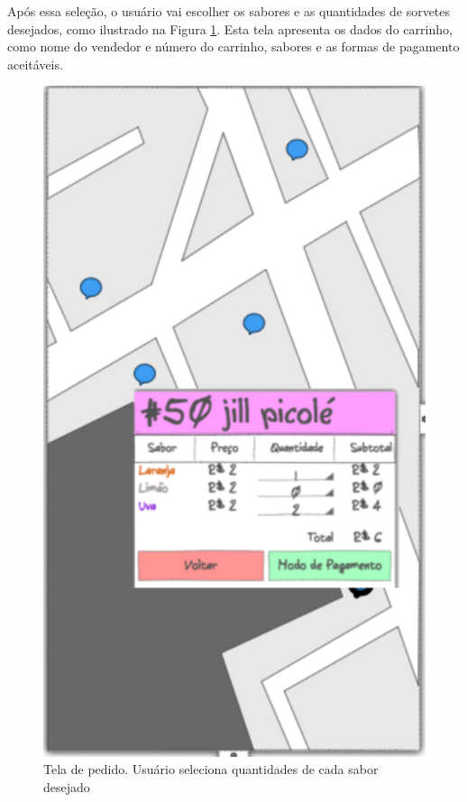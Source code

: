 Após essa seleção, o usuário vai escolher os sabores e as quantidades de sorvetes desejados, como ilustrado na Figura \ref{fig:pedido}. Esta tela apresenta os dados do carrinho, como nome do vendedor e número do carrinho, sabores e as formas de pagamento aceitáveis.

\begin{figure}[h]
	\centering
    \includegraphics[scale=0.7]{figuras/pedido}
	\caption{Tela de pedido. Usuário seleciona quantidades de cada sabor desejado}
    \label{fig:pedido}
\end{figure}

